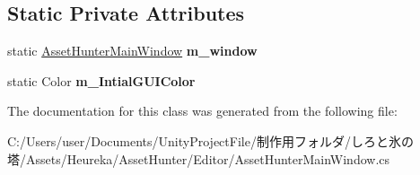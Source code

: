 \subsection*{Static Private Attributes}
\begin{DoxyCompactItemize}
\item 
\mbox{\label{class_asset_hunter_main_window_a24a5df87c7cbe58f23fcd7b3b8807a11}} 
static \hyperlink{class_asset_hunter_main_window}{Asset\+Hunter\+Main\+Window} {\bfseries m\+\_\+window}
\item 
\mbox{\label{class_asset_hunter_main_window_ab2a228a0fe9215b0b28426b8ea8cbb6b}} 
static Color {\bfseries m\+\_\+\+Intial\+G\+U\+I\+Color}
\end{DoxyCompactItemize}


The documentation for this class was generated from the following file\+:\begin{DoxyCompactItemize}
\item 
C\+:/\+Users/user/\+Documents/\+Unity\+Project\+File/制作用フォルダ/しろと氷の塔/\+Assets/\+Heureka/\+Asset\+Hunter/\+Editor/Asset\+Hunter\+Main\+Window.\+cs\end{DoxyCompactItemize}
